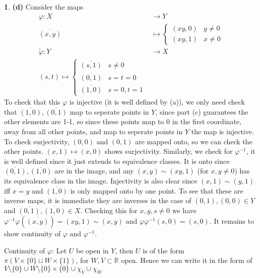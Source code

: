 \documentclass[10.5pt]{article}
\theoremstyle{definition}
\newtheorem{pb}{}
\newcommand{\set}[1]{\{#1\}}
\newcommand{\tand}{\text{ and }}
\begin{document}
\begin{pb}
        \textbf{(d)} Consider the maps
        \begin{align*}
            \varphi: X &\to Y \\
            \overline{(x,y)} &\mapsto \begin{cases}
                (xy,0) & y \neq 0 \\ 
                (xy,1) & x \neq 0
            \end{cases} \\
            \tilde{\varphi}: Y &\to X \\
            (s,t) \mapsto \begin{cases}
                \overline{(s,1)} & s \neq 0 \\
                \overline{(0,1)} & s = t = 0 \\
                \overline{(1,0)} & s=0, t=1
            \end{cases}
        \end{align*}
        To check that this \(\varphi\) is injective (it is well defined by (a)), we only need check that \(\overline{(1,0)}, \overline{(0,1)}\) map to seperate points in \(Y \), since part (c) guarantees
        the other elements are 1-1, so since these points map to \(0\) in the first coordinate, away from all other points, and map to seperate points in \(Y\) the map is injective.
        To check surjectivity, \((0,0) \tand (0,1)\) are mapped onto, so we can check the other points. \((x,1) \mapsto (x,0)\) shows surjectivity. Similarly, we check for \(\varphi^{-1}\),
        it is well defined since it just extends to equivalence classes. It is onto since \(\overline{(0,1)}, \overline{(1,0)}\) are in the image, and any
        \((x,y) \sim (xy,1)\) (for \(x,y \neq 0\)) has its equivalence class in the image. Injectivity is also clear since \((x,1) \sim (y,1)\) iff \(x=y\) and \(\overline{(1,0)}\) is only mapped onto by one point.
        To see that these are inverse maps, it is immediate they are inverses in the case of \((0,1),(0,0) \in Y\) and \(\overline{(0,1)},\overline{(1,0)} \in X\).
        Checking this for \(x,y,s \neq 0\) we have \(\varphi^{-1}\varphi(\overline{(x,y)}) = \overline{(xy,1)} \sim  (x,y) \tand \varphi \varphi^{-1}(s,0) = (s,0)\). It remains to show continuity of
        \(\varphi \tand \varphi^{-1}\).

        Continuity of \(\varphi\): Let \(U\) be open in \(Y\), then \(U\) is of the form \(\pi(V \times \set{0} \sqcup W \times \set{1})\), for \(W,V \subset \mathbb{R}\) open. Hence we can write it in the 
        form of \(V \setminus \set{0} \cup W\setminus \set{0} \times \set{0} \cup \chi_V \cup \chi_W\)
    \end{pb}
\end{document}
